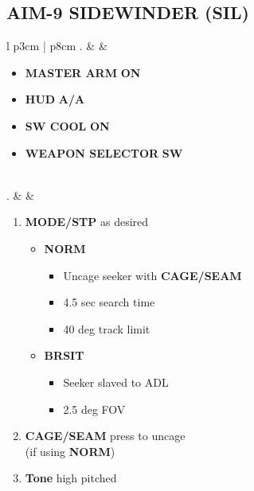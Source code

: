 \documentclass[8pt,usenames,dvipsnames,twoside]{article}
\begin{document}
		\subsection{AIM-9 SIDEWINDER (SIL)}
		\begin{center}
			\begin{tabular}{l p{3cm} | p{8cm}}
				. &  & 
				\begin{minipage}[t]{\linewidth}
					\vspace{-7pt}
					\begin{itemize}
						\item \textbf{MASTER ARM} \dotfill \textbf{ON}
						\item \textbf{HUD} \dotfill \textbf{A/A}
						\item \textbf{SW COOL} \dotfill \textbf{ON}
						\item \textbf{WEAPON SELECTOR} \dotfill \textbf{SW}
					\end{itemize} 
				\end{minipage} \\
				. &  & 
				\begin{minipage}[t]{\linewidth}
					\vspace{-7pt}
					\begin{enumerate}[label=(\alph*)]
						\item \textbf{MODE/STP} \dotfill as desired
						\begin{itemize}
							\item \textbf{NORM}
							\begin{itemize}
								\item Uncage seeker with \textbf{CAGE/SEAM}
								\item 4.5 sec search time
								\item 40 deg track limit
							\end{itemize}
							\item \textbf{BRSIT}
							\begin{itemize}
								\item Seeker slaved to ADL
								\item 2.5 deg FOV
							\end{itemize}
						\end{itemize}
						\item \textbf{CAGE/SEAM} \dotfill press to uncage \\
						\hfill (if using \textbf{NORM})
						\item \textbf{Tone} \dotfill high pitched
					\end{enumerate}

\end{minipage}
\end{tabular}
\end{center}
\end{document}
